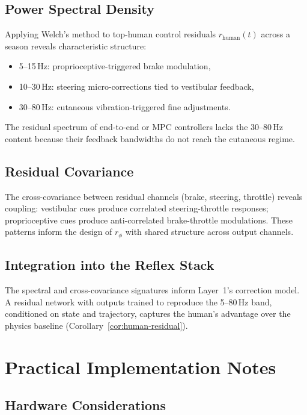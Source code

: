 \documentclass[11pt,twocolumn]{article}
\theoremstyle{definition}
\theoremstyle{remark}
\begin{document}
\subsection{Power Spectral Density}

Applying Welch's method to top-human control residuals $r_{\mathrm{human}}(t)$ across a season reveals characteristic structure:
\begin{itemize}[leftmargin=*,itemsep=2pt]
\item 5--15\,Hz: proprioceptive-triggered brake modulation,
\item 10--30\,Hz: steering micro-corrections tied to vestibular feedback,
\item 30--80\,Hz: cutaneous vibration-triggered fine adjustments.
\end{itemize}

The residual spectrum of end-to-end or MPC controllers lacks the 30--80\,Hz content because their feedback bandwidths do not reach the cutaneous regime.

\subsection{Residual Covariance}

The cross-covariance between residual channels (brake, steering, throttle) reveals coupling: vestibular cues produce correlated steering-throttle responses; proprioceptive cues produce anti-correlated brake-throttle modulations. These patterns inform the design of $r_\phi$ with shared structure across output channels.

\subsection{Integration into the Reflex Stack}

The spectral and cross-covariance signatures inform Layer~1's correction model. A residual network with outputs trained to reproduce the 5--80\,Hz band, conditioned on state and trajectory, captures the human's advantage over the physics baseline (Corollary~\ref{cor:human-residual}).

\section{Practical Implementation Notes}
\label{app:implementation}

\subsection{Hardware Considerations}
\end{document}
